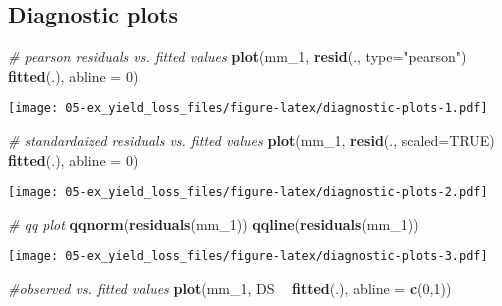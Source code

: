 \documentclass[]{book}
\newenvironment{Shaded}{\begin{snugshade}}{\end{snugshade}}
\newcommand{\CommentTok}[1]{\textcolor[rgb]{0.56,0.35,0.01}{\textit{#1}}}
\newcommand{\DataTypeTok}[1]{\textcolor[rgb]{0.13,0.29,0.53}{#1}}
\newcommand{\DecValTok}[1]{\textcolor[rgb]{0.00,0.00,0.81}{#1}}
\newcommand{\KeywordTok}[1]{\textcolor[rgb]{0.13,0.29,0.53}{\textbf{#1}}}
\newcommand{\NormalTok}[1]{#1}
\newcommand{\OperatorTok}[1]{\textcolor[rgb]{0.81,0.36,0.00}{\textbf{#1}}}
\newcommand{\OtherTok}[1]{\textcolor[rgb]{0.56,0.35,0.01}{#1}}
\newcommand{\StringTok}[1]{\textcolor[rgb]{0.31,0.60,0.02}{#1}}
\begin{document}
\hypertarget{diagnostic-plots-1}{%
\subsection{Diagnostic plots}\label{diagnostic-plots-1}}

\begin{Shaded}
\begin{Highlighting}[]
\CommentTok{# pearson residuals vs. fitted values}
\KeywordTok{plot}\NormalTok{(mm_}\DecValTok{1}\NormalTok{, }\KeywordTok{resid}\NormalTok{(., }\DataTypeTok{type=}\StringTok{"pearson"}\NormalTok{) }\OperatorTok{~}\StringTok{ }\KeywordTok{fitted}\NormalTok{(.), }\DataTypeTok{abline =} \DecValTok{0}\NormalTok{)}
\end{Highlighting}
\end{Shaded}

\texttt{[image: 05-ex\_yield\_loss\_files/figure-latex/diagnostic-plots-1.pdf]}

\begin{Shaded}
\begin{Highlighting}[]
\CommentTok{# standardaized residuals vs. fitted values}
\KeywordTok{plot}\NormalTok{(mm_}\DecValTok{1}\NormalTok{, }\KeywordTok{resid}\NormalTok{(., }\DataTypeTok{scaled=}\OtherTok{TRUE}\NormalTok{) }\OperatorTok{~}\StringTok{ }\KeywordTok{fitted}\NormalTok{(.), }\DataTypeTok{abline =} \DecValTok{0}\NormalTok{)}
\end{Highlighting}
\end{Shaded}

\texttt{[image: 05-ex\_yield\_loss\_files/figure-latex/diagnostic-plots-2.pdf]}

\begin{Shaded}
\begin{Highlighting}[]
\CommentTok{# qq plot}
\KeywordTok{qqnorm}\NormalTok{(}\KeywordTok{residuals}\NormalTok{(mm_}\DecValTok{1}\NormalTok{))}
\KeywordTok{qqline}\NormalTok{(}\KeywordTok{residuals}\NormalTok{(mm_}\DecValTok{1}\NormalTok{))}
\end{Highlighting}
\end{Shaded}

\texttt{[image: 05-ex\_yield\_loss\_files/figure-latex/diagnostic-plots-3.pdf]}

\begin{Shaded}
\begin{Highlighting}[]
\CommentTok{#observed vs. fitted values}
\KeywordTok{plot}\NormalTok{(mm_}\DecValTok{1}\NormalTok{, DS }\OperatorTok{~}\StringTok{ }\KeywordTok{fitted}\NormalTok{(.), }\DataTypeTok{abline =} \KeywordTok{c}\NormalTok{(}\DecValTok{0}\NormalTok{,}\DecValTok{1}\NormalTok{))}
\end{Highlighting}
\end{Shaded}
\end{document}
